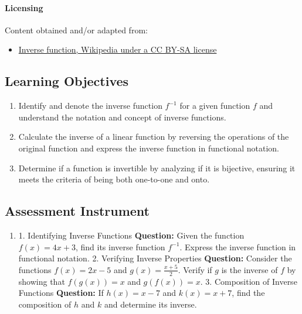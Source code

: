 \paragraph{Licensing}

Content obtained and/or adapted from:

\begin{itemize}
    \item \href{https://en.wikipedia.org/wiki/Inverse_function}{Inverse function, Wikipedia under a CC BY-SA license}
\end{itemize}

\subsection{Learning Objectives}

\begin{enumerate}
    \item Identify and denote the inverse function $f^{-1}$ for a given function $f$ and understand the notation and concept of inverse functions.
    \item Calculate the inverse of a linear function by reversing the operations of the original function and express the inverse function in functional notation.
    \item Determine if a function is invertible by analyzing if it is bijective, ensuring it meets the criteria of being both one-to-one and onto.
\end{enumerate}

\subsection{Assessment Instrument}

\begin{enumerate}
    \item 1. Identifying Inverse Functions \textbf{Question:} Given the function $f(x) = 4x + 3$, find its inverse function $f^{-1}$. Express the inverse function in functional notation. 2. Verifying Inverse Properties \textbf{Question:} Consider the functions $f(x) = 2x - 5$ and $g(x) = \frac{x + 5}{2}$. Verify if $g$ is the inverse of $f$ by showing that $f(g(x)) = x$ and $g(f(x)) = x$. 3. Composition of Inverse Functions \textbf{Question:} If $h(x) = x - 7$ and $k(x) = x + 7$, find the composition of $h$ and $k$ and determine its inverse.
\end{enumerate}

